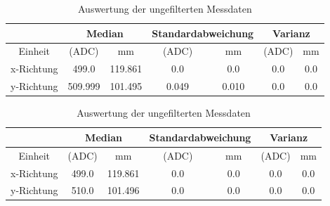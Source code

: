 \begin{table}[ht!]
    \caption{Auswertung der gefilterten Messdaten }
    \begin{center}
        \begin{tabular}{ |c|c|c|c|c|c|c| }
          \hline&\multicolumn{2}{c|}{Median}& \multicolumn{2}{c|}{Standardabweichung}&\multicolumn{2}{c|}{Varianz} \\ \hline
         Einheit    &(ADC)              &mm             &(ADC)          &mm             &(ADC)      &mm\\\hline
         x-Richtung & \SI{499,0}{}      & \SI{119,861}{}&\SI{0,0}{}     &\SI{0,0}{}     &\SI{0,0}{} & \SI{0,0}{} \\  \hline
         y-Richtung & \SI{509,999}{}    & \SI{101,495}{}&\SI{0,049}{}   &\SI{0,010}{}   &\SI{0,0}{} & \SI{0,0}{} \\ \hline  
        \end{tabular}
        \label{tab:genaufilter}
    \end{center}   
    \caption{Auswertung der ungefilterten Messdaten}
    \begin{center}
        \begin{tabular}{ |c|c|c|c|c|c|c| }
          \hline&\multicolumn{2}{c|}{Median}& \multicolumn{2}{c|}{Standardabweichung}&\multicolumn{2}{c|}{Varianz} \\ \hline
          Einheit &(ADC)&mm&(ADC)&mm&(ADC)&mm\\\hline
          x-Richtung & \SI{499,0}{} & \SI{119,861}{}&\SI{0,0}{}&\SI{0,0}{}&\SI{0,0}{} & \SI{0,0}{} \\  \hline
          y-Richtung & \SI{510,0}{} & \SI{101,496}{}&\SI{0,0}{}&\SI{0,0}{}&\SI{0,0}{} & \SI{0,0}{} \\ \hline  
        \end{tabular}
        \label{tab:genauunfilter}
    \end{center}   
\end{table}


